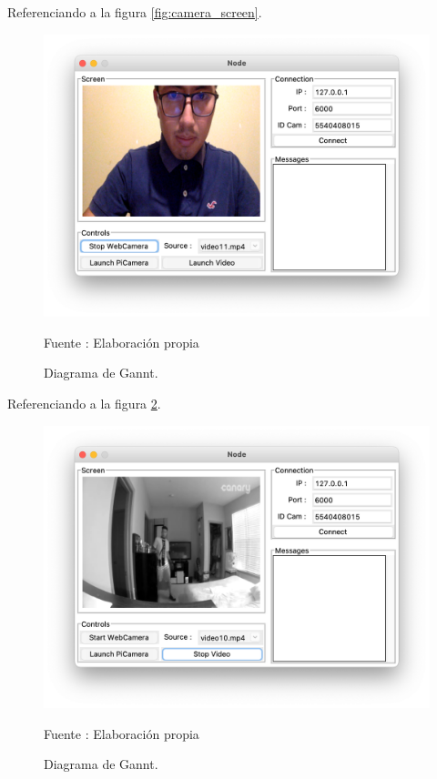 Referenciando a la figura \ref{fig:camera_screen}.
\begin{figure}[H]
    \begin{center}
        \includegraphics[width=13cm]{img/capitulo_4/webcamera.png}
        \caption{Diagrama de Gannt.}
        Fuente : Elaboración propia
        \label{fig:webcamera}
    \end{center}
\end{figure}

Referenciando a la figura \ref{fig:securityvideo}.
\begin{figure}[H]
    \begin{center}
        \includegraphics[width=13cm]{img/capitulo_4/security-video.png}
        \caption{Diagrama de Gannt.}
        Fuente : Elaboración propia
        \label{fig:securityvideo}
    \end{center}
\end{figure}

